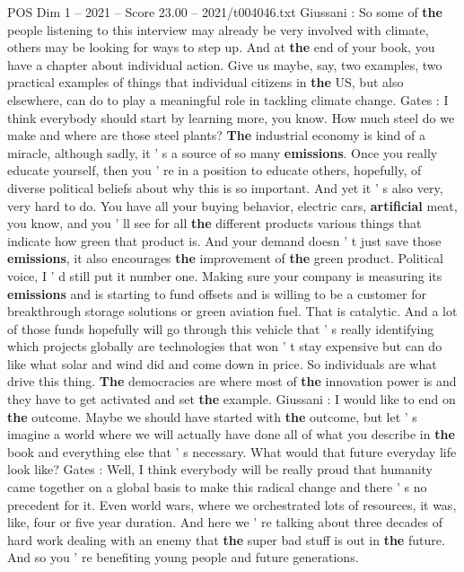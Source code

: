 \begin{textsample}{POS Dim 1 – 2021 – Score 23.00 – 2021/t004046.txt}
Giussani : So some of \textbf{the} people listening to this interview may already be very involved with climate, others may be looking for ways to step up.
And at \textbf{the} end of your book, you have a chapter about individual action.
Give us maybe, say, two examples, two practical examples of things that individual citizens in \textbf{the} US, but also elsewhere, can do to play a meaningful role in tackling climate change.
Gates : I think everybody should start by learning more, you know.
How much steel do we make and where are those steel plants? \textbf{The} industrial economy is kind of a miracle, although sadly, it ' s a source of so many \textbf{emissions}.
Once you really educate yourself, then you ' re in a position to educate others, hopefully, of diverse political beliefs about why this is so important.
And yet it ' s also very, very hard to do.
You have all your buying behavior, electric cars, \textbf{artificial} meat, you know, and you ' ll see for all \textbf{the} different products various things that indicate how green that product is.
And your demand doesn ' t just save those \textbf{emissions}, it also encourages \textbf{the} improvement of \textbf{the} green product.
Political voice, I ' d still put it number one.
Making sure your company is measuring its \textbf{emissions} and is starting to fund offsets and is willing to be a customer for breakthrough storage solutions or green aviation fuel.
That is catalytic.
And a lot of those funds hopefully will go through this vehicle that ' s really identifying which projects globally are technologies that won ' t stay expensive but can do like what solar and wind did and come down in price.
So individuals are what drive this thing. \textbf{The} democracies are where most of \textbf{the} innovation power is and they have to get activated and set \textbf{the} example.
Giussani : I would like to end on \textbf{the} outcome.
Maybe we should have started with \textbf{the} outcome, but let ' s imagine a world where we will actually have done all of what you describe in \textbf{the} book and everything else that ' s necessary.
What would that future everyday life look like?
Gates : Well, I think everybody will be really proud that humanity came together on a global basis to make this radical change and there ' s no precedent for it.
Even world wars, where we orchestrated lots of resources, it was, like, four or five year duration.
And here we ' re talking about three decades of hard work dealing with an enemy that \textbf{the} super bad stuff is out in \textbf{the} future.
And so you ' re benefiting young people and future generations.

\end{textsample}
